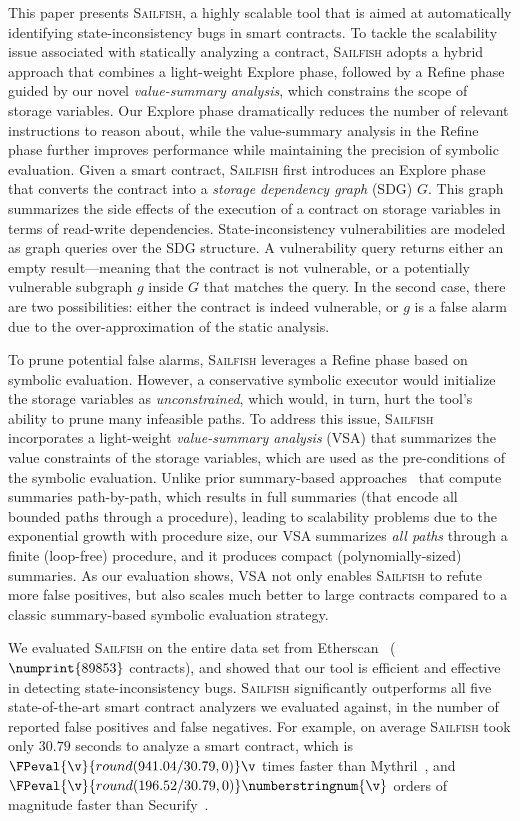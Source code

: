 \documentclass[conference, romanappendices]{tex/IEEEtran}
\theoremstyle{bfnote}
\newcommand{\toolname}{\textsc{Sailfish}\xspace}
\newcommand{\explore}{{\sc Explore}\xspace}
\newcommand{\refine}{{\sc Refine}\xspace}
\newcommand{\securify}{{\sc Securify}\xspace}
\newcommand{\smart}{smart contract}
\newcommand{\etherscan}{{\sc Etherscan}\xspace}
\newcommand{\si}{{state-inconsistency}\xspace}
\newcommand{\vsa}{{value-summary analysis}\xspace}
\newcommand{\sdg}{storage dependency graph\xspace}
\newcommand{\mythril}{{\sc Mythril}\xspace}
\let\num\numprint
\newcommand{\dataset}{89853}
\newcommand{\securifyAnalysisTimeFull}{196.52}
\newcommand{\mythrilAnalysisTimeFull}{941.04}
\newcommand{\clintAnalysisTimeFull}{30.79}
\begin{document}
This paper presents \toolname, a highly scalable tool that is aimed at automatically identifying \si bugs in \smart s.
To tackle the scalability issue associated with statically analyzing a contract, \toolname adopts a hybrid approach that combines a light-weight \explore phase, followed by a \refine phase guided by our novel \emph{\vsa}, which constrains the scope of storage variables.
Our \explore phase dramatically reduces the number of relevant instructions to reason about, while the \vsa in the \refine phase further improves performance while maintaining the precision of symbolic evaluation.
Given a smart contract, \toolname first introduces an \explore phase that converts the contract into a \emph{\sdg} ({SDG\EndAccSupp{}}) $G$.
This graph summarizes the side effects of the execution of a contract on storage variables in terms of read-write dependencies.
State-inconsistency vulnerabilities are modeled as graph queries over the {SDG\EndAccSupp{}} structure.
A vulnerability query returns either an empty result---meaning that the contract is not vulnerable, or a potentially vulnerable subgraph $g$ inside $G$ that matches the query.
In the second case, there are two possibilities: either the contract is indeed vulnerable, or $g$ is a false alarm due to the over-approximation of the static analysis. 

To prune potential false alarms, \toolname leverages a \refine phase based on symbolic evaluation.
However, a conservative symbolic executor would initialize the storage variables as \textit{unconstrained}, which would, in turn, hurt the tool's ability to prune many infeasible paths.
To address this issue, \toolname incorporates a light-weight \emph{\vsa} (VSA) that summarizes the value constraints of the storage variables, which are used as the pre-conditions of the symbolic evaluation.
Unlike prior summary-based approaches~\cite{solar,Godefroid07,AnandGT08} that compute summaries path-by-path, which results in full summaries (that encode all bounded paths through a procedure), leading to scalability problems due to the exponential growth with procedure size, 
our VSA summarizes \emph{all paths} through a finite (loop-free) procedure, and it produces compact (polynomially-sized) summaries.
As our evaluation shows, VSA not only enables \toolname to refute more false positives, but also scales much better to large contracts compared to a classic summary-based symbolic evaluation strategy.

We evaluated \toolname on the entire data set from \etherscan~\cite{etherscan} ($\num{\dataset}$ contracts), and showed that our tool is efficient and effective in detecting \si bugs.
\toolname significantly outperforms all five state-of-the-art \smart{} analyzers we evaluated against, in the number of reported false positives and false negatives.
For example, on average \toolname took only $\clintAnalysisTimeFull$ seconds to analyze a \smart, which is $\FPeval{\v}{round(\mythrilAnalysisTimeFull/\clintAnalysisTimeFull,0)}\v$ times faster than \mythril~\cite{mythril}, and $\FPeval{\v}{round(\securifyAnalysisTimeFull/\clintAnalysisTimeFull,0)}\text{\numberstringnum{\v}}$ orders of magnitude faster than \securify~\cite{securify}. 
\end{document}
